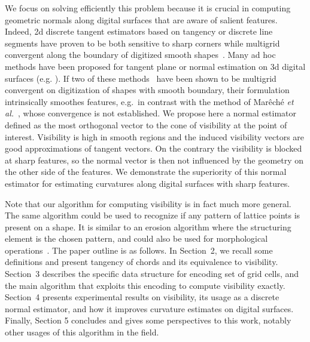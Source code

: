 \documentclass[runningheads]{llncs}
\begin{document}
    We focus on solving efficiently this problem because it is crucial
    in computing geometric normals along digital surfaces that are
    aware of salient features. Indeed, 2d discrete tangent estimators
    based on tangency or discrete line segments have proven to be both
    sensitive to sharp corners while multigrid convergent along the
    boundary of digitized smooth shapes~\cite{feschet:1999-dgci,lachaud:2007-ivc,nguyen:2011-pr}.
    Many ad hoc methods have been proposed for tangent plane or normal
    estimation on 3d digital surfaces
    (e.g. \cite{fourey:2009-cg,charrier:2011-iwcia,Cuel:2014-dgci,Lachaud:2017-lnm,mareche:2024-ispr}).
    If two of these methods~\cite{Cuel:2014-dgci,Lachaud:2017-lnm}
    have been shown to be multigrid convergent on digitization of
    shapes with smooth boundary, their formulation intrinsically
    smoothes features, e.g.\ in contrast with the method of
    Mar{ê}ch{é} \emph{et al.}~\cite{mareche:2024-ispr}, whose
    convergence is not established. We propose here a normal estimator
    defined as the most orthogonal vector to the cone of visibility at
    the point of interest. Visibility is high in smooth regions and
    the induced visibility vectors are good approximations of tangent
    vectors. On the contrary the visibility is blocked at sharp
    features, so the normal vector is then not influenced by the
    geometry on the other side of the features. We demonstrate the
    superiority of this normal estimator for estimating curvatures
    along digital surfaces with sharp features.

    Note that our algorithm for computing visibility is in fact much
    more general. The same algorithm could be used to recognize if any
    pattern of lattice points is present on a shape. It is similar to
    an erosion algorithm where the structuring element is the chosen
    pattern, and could also be used for morphological operations~\cite{soille1999morphological}.
    The paper outline is as follows. In Section~2, we recall some
    definitions and present tangency of chords and its equivalence
    to visibility. Section~3 describes the specific data structure
    for encoding set of grid cells, and the main algorithm that
    exploits this encoding to compute visibility exactly. Section~4
    presents experimental results on visibility, its usage as a
    discrete normal estimator, and how it improves curvature estimates
    on digital surfaces. Finally, Section 5 concludes and gives some
    perspectives to this work, notably other usages of this algorithm
    in the field.
\end{document}
